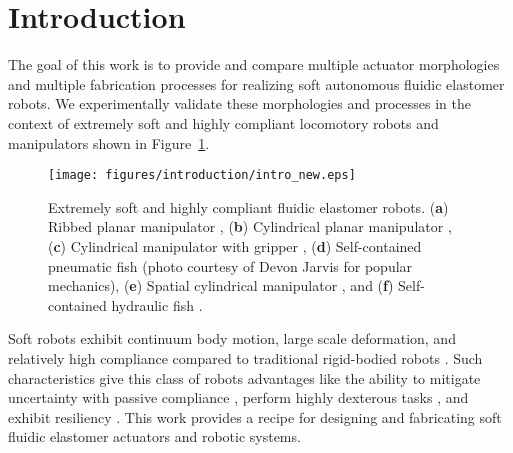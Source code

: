 
\section{Introduction}
\label{sec:Introduction}
The goal of this work is to provide and compare multiple actuator morphologies and multiple fabrication processes for realizing soft autonomous fluidic elastomer robots.
%
We experimentally validate these morphologies and processes in the context of extremely soft and highly compliant locomotory robots and manipulators shown in Figure~\ref{fig:intro_new}.
\begin{figure}[!t]
  \centering
  \texttt{[image: figures/introduction/intro\_new.eps]}
  \caption{Extremely soft and highly compliant fluidic elastomer robots. (\textbf{a}) Ribbed planar manipulator \citep{marchese2014design}, (\textbf{b}) Cylindrical planar manipulator \citep{marchese2014whole}, (\textbf{c}) Cylindrical manipulator with gripper \citep{katzschmann2015autonomous}, (\textbf{d}) Self-contained pneumatic fish \citep{marchese2014autonomous}(photo courtesy of Devon Jarvis for popular mechanics), (\textbf{e}) Spatial cylindrical manipulator \citep{marchese2015design}, and (\textbf{f}) Self-contained hydraulic fish \citep{katzschmann2014hydraulic}. }\label{fig:intro_new}
\end{figure}

Soft robots exhibit continuum body motion, large scale deformation, and relatively high compliance compared to traditional rigid-bodied robots \citep{trivedi2008soft}.
%
Such characteristics give this class of robots advantages like the ability to mitigate uncertainty with passive compliance \citep{mcmahan2006field}, perform highly dexterous tasks \citep{deimel2014novel}, and exhibit resiliency \citep{tolley2014resilient}.
%
This work provides a recipe for designing and fabricating soft fluidic elastomer actuators and robotic systems.

